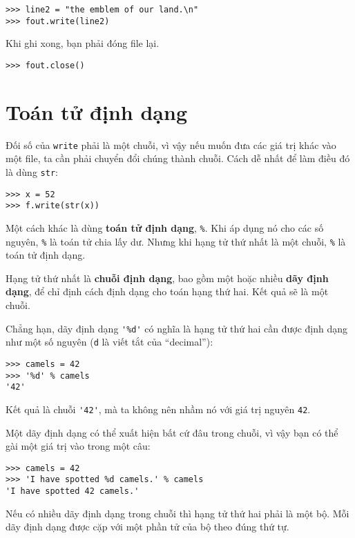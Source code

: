 \documentclass[11pt]{book}
\begin{document}
\beforeverb
\begin{verbatim}
>>> line2 = "the emblem of our land.\n"
>>> fout.write(line2)
\end{verbatim}
\afterverb
%
Khi ghi xong, bạn phải đóng file lại.

\beforeverb
\begin{verbatim}
>>> fout.close()
\end{verbatim}
\afterverb
%



\section{Toán tử định dạng}


Đối số của {\tt write} phải là một chuỗi, vì vậy nếu muốn
đưa các giá trị khác vào một file, ta cần phải chuyển đổi
chúng thành chuỗi. Cách dễ nhất để làm điều đó là dùng {\tt str}:

\beforeverb
\begin{verbatim}
>>> x = 52
>>> f.write(str(x))
\end{verbatim}
\afterverb
%
Một cách khác là dùng {\bf toán tử định dạng}, {\tt \%}.  Khi
áp dụng nó cho các số nguyên, {\tt \%} là toán tử chia lấy dư. Nhưng
khi hạng tử thứ nhất là một chuỗi, {\tt \%} là toán tử định dạng.


Hạng tử thứ nhất là {\bf chuỗi định dạng}, bao gồm một
hoặc nhiều {\bf dãy định dạng}, để chỉ định cách định dạng
cho toán hạng thứ hai. Kết quả sẽ là một chuỗi.


Chẳng hạn, dãy định dạng \verb"'%d'" có nghĩa là hạng tử
thứ hai cần được định dạng như một số nguyên 
 ({\tt d} là viết tắt của ``decimal''):

\beforeverb
\begin{verbatim}
>>> camels = 42
>>> '%d' % camels
'42'
\end{verbatim}
\afterverb
%
Kết quả là chuỗi \verb"'42'", mà ta không nên nhầm nó với 
giá trị nguyên {\tt 42}.

Một dãy định dạng có thể xuất hiện bất cứ đâu trong chuỗi,
vì vậy bạn có thể gài một giá trị vào trong một câu:

\beforeverb
\begin{verbatim}
>>> camels = 42
>>> 'I have spotted %d camels.' % camels
'I have spotted 42 camels.'
\end{verbatim}
\afterverb
%
Nếu có nhiều dãy định dạng trong chuỗi thì hạng tử thứ hai
phải là một bộ. Mỗi dãy định dạng được cặp với một phần tử
của bộ theo đúng thứ tự.
\end{document}
